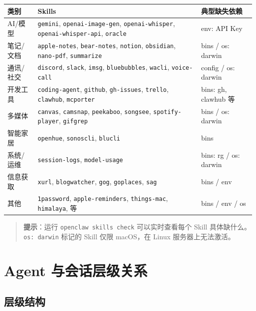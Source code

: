 \begin{table}[h]
\centering
\small
\begin{tabular}{|l|l|l|}
\hline
类别 & Skills & 典型缺失依赖 \\
\hline
AI/模型 & \texttt{gemini}, \texttt{openai-image-gen}, \texttt{openai-whisper}, \texttt{openai-whisper-api}, \texttt{oracle} & env: API Key \\
\hline
笔记/文档 & \texttt{apple-notes}, \texttt{bear-notes}, \texttt{notion}, \texttt{obsidian}, \texttt{nano-pdf}, \texttt{summarize} & bins / os: darwin \\
\hline
通讯/社交 & \texttt{discord}, \texttt{slack}, \texttt{imsg}, \texttt{bluebubbles}, \texttt{wacli}, \texttt{voice-call} & config / os: darwin \\
\hline
开发工具 & \texttt{coding-agent}, \texttt{github}, \texttt{gh-issues}, \texttt{trello}, \texttt{clawhub}, \texttt{mcporter} & bins: gh, clawhub 等 \\
\hline
多媒体 & \texttt{canvas}, \texttt{camsnap}, \texttt{peekaboo}, \texttt{songsee}, \texttt{spotify-player}, \texttt{gifgrep} & bins / os: darwin \\
\hline
智能家居 & \texttt{openhue}, \texttt{sonoscli}, \texttt{blucli} & bins \\
\hline
系统/运维 & \texttt{session-logs}, \texttt{model-usage} & bins: rg / os: darwin \\
\hline
信息获取 & \texttt{xurl}, \texttt{blogwatcher}, \texttt{gog}, \texttt{goplaces}, \texttt{sag} & bins / env \\
\hline
其他 & \texttt{1password}, \texttt{apple-reminders}, \texttt{things-mac}, \texttt{himalaya}, 等 & bins / env / os \\
\hline
\end{tabular}
\end{table}

\begin{quote}
\textbf{提示}：运行 \texttt{openclaw skills check} 可以实时查看每个 Skill 具体缺什么。\texttt{os: darwin} 标记的 Skill 仅限 macOS，在 Linux 服务器上无法激活。
\end{quote}

\hrulefill

\section{Agent 与会话层级关系}


\subsection{层级结构}


